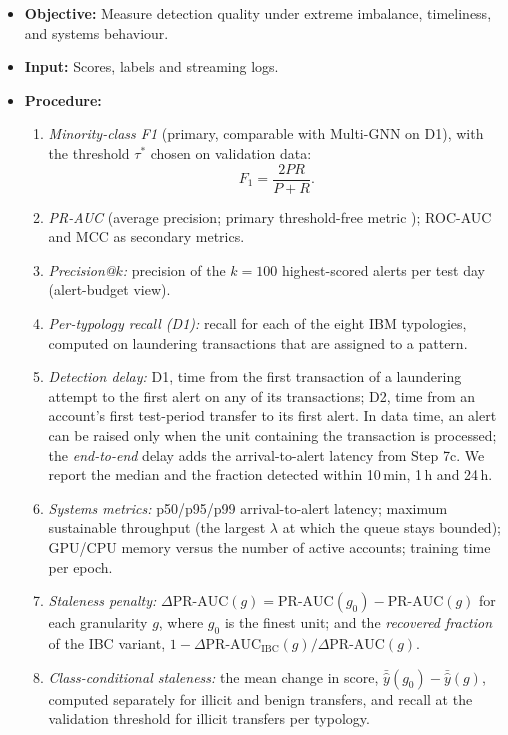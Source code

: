 \documentclass[11pt,a4paper]{article}
\begin{document}
\begin{itemize}[leftmargin=*]
    \item \textbf{Objective:} Measure detection quality under extreme imbalance, timeliness, and systems behaviour.
    \item \textbf{Input:} Scores, labels and streaming logs.
    \item \textbf{Procedure:}
    \begin{enumerate}[leftmargin=*]
        \item \textit{Minority-class F1} (primary, comparable with Multi-GNN on D1), with the threshold $\tau^*$ chosen on validation data:
        \begin{equation}
            F_1 = \frac{2PR}{P+R}.
        \end{equation}
        \item \textit{PR-AUC} (average precision; primary threshold-free metric \cite{saito2015prroc}); ROC-AUC and MCC \cite{chicco2020mcc} as secondary metrics.
        \item \textit{Precision@$k$:} precision of the $k=100$ highest-scored alerts per test day (alert-budget view).
        \item \textit{Per-typology recall (D1):} recall for each of the eight IBM typologies, computed on laundering transactions that are assigned to a pattern.
        \item \textit{Detection delay:} D1, time from the first transaction of a laundering attempt to the first alert on any of its transactions; D2, time from an account's first test-period transfer to its first alert. In data time, an alert can be raised only when the unit containing the transaction is processed; the \emph{end-to-end} delay adds the arrival-to-alert latency from Step 7c. We report the median and the fraction detected within 10\,min, 1\,h and 24\,h.
        \item \textit{Systems metrics:} p50/p95/p99 arrival-to-alert latency; maximum sustainable throughput (the largest $\lambda$ at which the queue stays bounded); GPU/CPU memory versus the number of active accounts; training time per epoch.
        \item \textit{Staleness penalty:} $\Delta\text{PR-AUC}(g) = \text{PR-AUC}(g_0) - \text{PR-AUC}(g)$ for each granularity $g$, where $g_0$ is the finest unit; and the \emph{recovered fraction} of the IBC variant, $1 - \Delta\text{PR-AUC}_{\text{IBC}}(g) / \Delta\text{PR-AUC}(g)$.
        \item \textit{Class-conditional staleness:} the mean change in score, $\bar{\hat{y}}(g_0)-\bar{\hat{y}}(g)$, computed separately for illicit and benign transfers, and recall at the validation threshold for illicit transfers per typology.

\end{enumerate}
\end{itemize}
\end{document}
